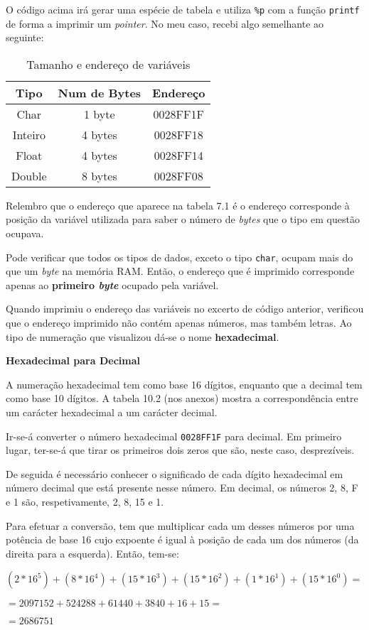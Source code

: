 O código acima irá gerar uma espécie de tabela e utiliza \texttt{\%p} com a função \texttt{printf} de forma a imprimir um \textit{pointer}. No meu caso, recebi algo semelhante ao seguinte:

\begin{table}[h]
\center\begin{tabular}{|c|c|c|}
\hline
\textbf{Tipo} & \textbf{Num de Bytes} & \textbf{Endereço} \\ \hline
Char          & 1 byte                & 0028FF1F          \\ \hline
Inteiro       & 4 bytes               & 0028FF18          \\ \hline
Float         & 4 bytes               & 0028FF14          \\ \hline
Double        & 8 bytes               & 0028FF08          \\ \hline
\end{tabular}
\caption{Tamanho e endereço de variáveis}
\end{table}

Relembro que o endereço que aparece na tabela 7.1 é o endereço corresponde à posição da variável utilizada para saber o número de \textit{bytes} que o tipo em questão ocupava. 

Pode verificar que todos os tipos de dados, exceto o tipo \texttt{char}, ocupam mais do que um \textit{byte} na memória RAM. Então, o endereço que é imprimido corresponde apenas ao \textbf{primeiro \textit{byte}} ocupado pela variável.

Quando imprimiu o endereço das variáveis no excerto de código anterior, verificou que o endereço imprimido não contém apenas números, mas também letras. Ao tipo de numeração que visualizou dá-se o nome \textbf{hexadecimal}.

\begin{mdframed}[backgroundcolor=cinzaclaro, linewidth=0pt]
\textbf{Hexadecimal para Decimal}

A numeração hexadecimal tem como base 16 dígitos, enquanto que a decimal tem como base 10 dígitos. A tabela 10.2 (nos anexos) mostra a correspondência entre um carácter hexadecimal a um carácter decimal.

Ir-se-á converter o número hexadecimal \texttt{0028FF1F} para decimal. Em primeiro lugar, ter-se-á que tirar os primeiros dois zeros que são, neste caso, desprezíveis.

De seguida é necessário conhecer o significado de cada dígito hexadecimal em número decimal que está presente nesse número. Em decimal, os números 2, 8, F e 1 são, respetivamente, 2, 8, 15 e 1.

Para efetuar a conversão, tem que multiplicar cada um desses números por uma potência de base 16 cujo expoente é igual à posição de cada um dos números (da direita para a esquerda). Então, tem-se:

$(2*16^5)+(8*16^4)+(15*16^3)+(15*16^2)+(1*16^1)+(15*16^0)= $

$= 2097152+524288+61440+3840+16+15 =$

$= 2686751$
\end{mdframed}

